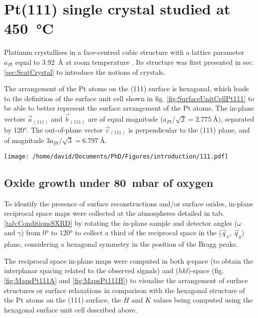 \section{Pt(111) single crystal studied at \qty{450}{\degreeCelsius}} \label{sec:SXRD111}

Platinum crystallises in a face-centred cubic structure with a lattice parameter $a_{Pt}$ equal to \qty{3.92}{\angstrom} at room temperature \parencite{Waseda1975}.
Its structure was first presented in sec. \ref{sec:ScatCrystal} to introduce the notions of crystals.

The arrangement of the Pt atoms on the (111) surface is hexagonal, which leads to the definition of the surface unit cell shown in fig. \ref{fig:SurfaceUnitCellPt111} to be able to better represent the surface arrangement of the Pt atoms.
The in-plane vectors $\vec{a}_{(111)}$ and $\vec{b}_{(111)}$ are of equal magnitude ($a_{Pt} / \sqrt{2} = \qty{2.775}{\angstrom})$, separated by \ang{120}.
The out-of-plane vector $\vec{c}_{(111)}$ is perpendicular to the (111) plane, and of magnitude $3 a_{Pt} / \sqrt{3} = \qty{6.797}{\angstrom}$.

\begin{SCfigure}
    \centering
    \texttt{[image: /home/david/Documents/PhD/Figures/introduction/111.pdf]}
    \caption{
        Face-centred cubic unit cell of Pt with (111) crystallographic plane drawn in green.
        $\vec{a}_{(111)}$, $\vec{b}_{(111)}$ and $\vec{c}_{(111)}$ are the $(111)$ surface unit cell vectors.
        There are three \{111\} planes spanned by the magnitude of $\vec{c}_{(111)}$ (blue, red and green on the figure).
    }
    \label{fig:SurfaceUnitCellPt111}
\end{SCfigure}

\subsection{Oxide growth under \qty{80}{\milli\bar} of oxygen}

To identify the presence of surface reconstructions and/or surface oxides, in-plane reciprocal space maps were collected at the atmospheres detailed in tab. \ref{tab:ConditionsSXRD} by rotating the in-plane sample and detector angles ($\omega$ and $\gamma$) from \ang{0} to \ang{120} to collect a third of the reciprocal space in the ($\vec{q}_x$, $\vec{q}_y$) plane, considering a hexagonal symmetry in the position of the Bragg peaks.

The reciprocal space in-plane maps were computed in both $q$-space (to obtain the interplanar spacing related to the observed signals) and ($hkl$)-space (fig. \ref{fig:MapsPt111A} and \ref{fig:MapsPt111B}) to visualise the arrangement of surface structures or surface relaxations in comparison with the hexagonal structure of the Pt atoms on the (111) surface, the $H$ and $K$ values being computed using the hexagonal surface unit cell described above.

